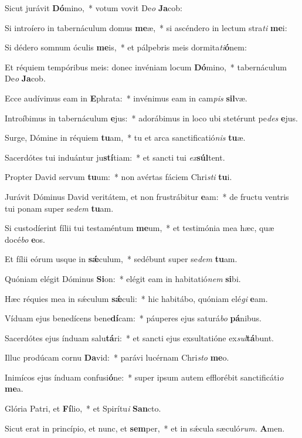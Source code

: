 \item Sicut jurávit \textbf{Dó}mino,~* votum vovit De\tinyhspace\textit{o} \textbf{Ja}cob:
\item Si introíero in tabernáculum domus \textbf{me}æ,~* si ascéndero in lectum stra\textit{ti} \textbf{me}i:
\item Si dédero somnum óculis \textbf{me}is,~* et pálpebris meis dormita\hspace{0.02em}\textit{ti}\textbf{ó}nem:
\item Et réquiem tempóribus meis: donec invéniam locum \textbf{Dó}mino,~* tabernáculum De\hspace*{0.02em}\textit{o} \textbf{Ja}cob.
\item Ecce audívimus eam in \textbf{E}phrata:~* invénimus eam in cam\textit{pis} \textbf{sil}væ.
\item Introíbimus in tabernáculum \textbf{e}jus:~* adorábimus in loco ubi stetérunt pe\textit{des} \textbf{e}jus.
\item Surge, Dómine in réquiem \textbf{tu}am,~* tu et arca sanctificatió\textit{nis} \textbf{tu}æ.
\item Sacerdótes tui induántur ju\textbf{stí}tiam:~* et sancti tui \textit{ex}\textbf{súl}tent.
\item Propter David servum \textbf{tu}um:~* non avértas fáciem Chri\myhspace\textit{sti} \textbf{tu}i.
\item Jurávit Dóminus David veritátem, et non frustrábitur \textbf{e}am:~* de fructu ventris tui ponam super se\tinyhspace\textit{dem} \textbf{tu}am.
\item Si custodíerint fílii tui testaméntum \textbf{me}um,~* et testimónia mea hæc, quæ docé\textit{bo} \textbf{e}os.
\item Et fílii eórum usque in \textbf{sǽ}culum,~* sedébunt super se\tinyhspace\textit{dem} \textbf{tu}am.
\item Quóniam elégit Dóminus \textbf{Si}on:~* elégit eam in habitatió\textit{nem} \textbf{si}bi.
\item Hæc réquies mea in sǽculum \textbf{sǽ}culi:~* hic habitábo, quóniam elé\textit{gi} \textbf{e}am.
\item Víduam ejus benedícens bene\textbf{dí}cam:~* páuperes ejus saturá\textit{bo} \textbf{pá}nibus.
\item Sacerdótes ejus índuam salu\textbf{tá}ri:~* et sancti ejus exsultatióne ex\textit{sul}\textbf{tá}bunt.
\item Illuc prodúcam cornu \textbf{Da}vid:~* parávi lucérnam Chri\myhspace\textit{sto} \textbf{me}o.
\item Inimícos ejus índuam confusi\textbf{ó}ne:~* super ipsum autem efflorébit sanctificáti\hspace*{0.02em}\textit{o} \textbf{me}a.
\item Glória Patri, et \textbf{Fí}lio,~* et Spirítu\tinyhspace\textit{i} \textbf{San}cto.
\item Sicut erat in princípio, et nunc, et \textbf{sem}per,~* et in sǽcula sæculó\textit{rum.} \textbf{A}men.

